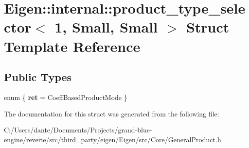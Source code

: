 \hypertarget{struct_eigen_1_1internal_1_1product__type__selector_3_011_00_01_small_00_01_small_01_4}{}\section{Eigen\+::internal\+::product\+\_\+type\+\_\+selector$<$ 1, Small, Small $>$ Struct Template Reference}
\label{struct_eigen_1_1internal_1_1product__type__selector_3_011_00_01_small_00_01_small_01_4}
\subsection*{Public Types}
\begin{DoxyCompactItemize}
\item 
\mbox{\label{struct_eigen_1_1internal_1_1product__type__selector_3_011_00_01_small_00_01_small_01_4_a1346acbdabf04910b6b7ba69bfb68381}} 
enum \{ {\bfseries ret} = Coeff\+Based\+Product\+Mode
 \}
\end{DoxyCompactItemize}


The documentation for this struct was generated from the following file\+:\begin{DoxyCompactItemize}
\item 
C\+:/\+Users/dante/\+Documents/\+Projects/grand-\/blue-\/engine/reverie/src/third\+\_\+party/eigen/\+Eigen/src/\+Core/General\+Product.\+h\end{DoxyCompactItemize}
